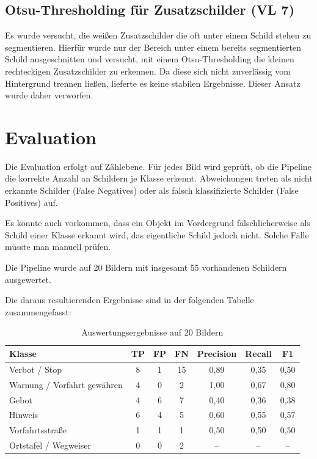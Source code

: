 \documentclass[12pt,oneside]{article}
\begin{document}
\subsection{Otsu-Thresholding für Zusatzschilder (VL 7)}

Es wurde versucht, die weißen Zusatzschilder die oft unter einem Schild stehen zu segmentieren. Hierfür wurde nur der Bereich unter einem bereits segmentierten Schild \glqq ausgeschnitten\grqq{} und versucht, mit einem Otsu-Thresholding die kleinen rechteckigen Zusatzschilder zu erkennen. Da diese sich nicht zuverlässig vom Hintergrund trennen ließen, lieferte es keine stabilen Ergebnisse. Dieser Ansatz wurde daher verworfen.

\section{Evaluation}

Die Evaluation erfolgt auf Zählebene. Für jedes Bild wird geprüft, ob die Pipeline die korrekte Anzahl an Schildern je Klasse erkennt. Abweichungen treten als nicht erkannte Schilder (False Negatives) oder als falsch klassifizierte Schilder (False Positives) auf.

Es könnte auch vorkommen, dass ein Objekt im Vordergrund fälschlicherweise als Schild einer Klasse erkannt wird, das eigentliche Schild jedoch nicht. Solche Fälle müsste man manuell prüfen.

Die Pipeline wurde auf 20 Bildern mit insgesamt 55 vorhandenen Schildern ausgewertet.

Die daraus resultierenden Ergebnisse sind in der folgenden Tabelle zusammengefasst:

\begin{table}[H]
\centering
\begin{tabular}{|l|c|c|c|c|c|c|}
\hline
\textbf{Klasse} & \textbf{TP} & \textbf{FP} & \textbf{FN} & \textbf{Precision} & \textbf{Recall} & \textbf{F1} \\
\hline
Verbot / Stop                  & 8 & 1  & 15 & 0{,}89 & 0{,}35 & 0{,}50 \\
Warnung / Vorfahrt gewähren    & 4 & 0  & 2  & 1{,}00 & 0{,}67 & 0{,}80 \\
Gebot                          & 4 & 6  & 7  & 0{,}40 & 0{,}36 & 0{,}38 \\
Hinweis                        & 6 & 4  & 5  & 0{,}60 & 0{,}55 & 0{,}57 \\
Vorfahrtsstraße                & 1 & 1  & 1  & 0{,}50 & 0{,}50 & 0{,}50 \\
Ortstafel / Wegweiser          & 0 & 0  & 2  & --     & -- & -- \\
\hline
\end{tabular}
\caption{Auswertungsergebnisse auf 20 Bildern}
\end{table}
\end{document}
